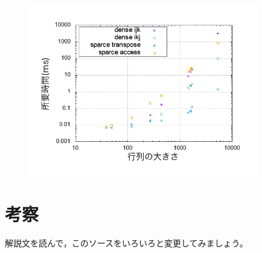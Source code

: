 \documentclass[11pt,a4paper]{jsarticle}
\begin{document}
\begin{figure}[H]
  \begin{center}
  \includegraphics[width=10cm]{../graph.png}
  \end{center}
\end{figure}


\section{考察}

解説文を読んで，このソースをいろいろと変更してみましょう。
\end{document}
